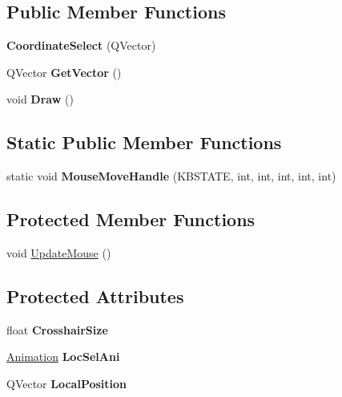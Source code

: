 \subsection*{Public Member Functions}
\begin{DoxyCompactItemize}
\item 
{\bfseries Coordinate\+Select} (Q\+Vector)\hypertarget{classCoordinateSelect_a940c5f6b9f4fd39ac7aaab7e03520146}{}\label{classCoordinateSelect_a940c5f6b9f4fd39ac7aaab7e03520146}

\item 
Q\+Vector {\bfseries Get\+Vector} ()\hypertarget{classCoordinateSelect_a224993e25ecf585555ea5223ea8e8417}{}\label{classCoordinateSelect_a224993e25ecf585555ea5223ea8e8417}

\item 
void {\bfseries Draw} ()\hypertarget{classCoordinateSelect_a95c5bdd9e68c9bc234d6f7be40a80e93}{}\label{classCoordinateSelect_a95c5bdd9e68c9bc234d6f7be40a80e93}

\end{DoxyCompactItemize}
\subsection*{Static Public Member Functions}
\begin{DoxyCompactItemize}
\item 
static void {\bfseries Mouse\+Move\+Handle} (K\+B\+S\+T\+A\+TE, int, int, int, int, int)\hypertarget{classCoordinateSelect_a4309312034b454ca69e76dbbdf8b935c}{}\label{classCoordinateSelect_a4309312034b454ca69e76dbbdf8b935c}

\end{DoxyCompactItemize}
\subsection*{Protected Member Functions}
\begin{DoxyCompactItemize}
\item 
void \hyperlink{classCoordinateSelect_aee21b92610c335294dfd319587edb13c}{Update\+Mouse} ()
\end{DoxyCompactItemize}
\subsection*{Protected Attributes}
\begin{DoxyCompactItemize}
\item 
float {\bfseries Crosshair\+Size}\hypertarget{classCoordinateSelect_a9908f8b93ac19dd8100abc32ba8d0472}{}\label{classCoordinateSelect_a9908f8b93ac19dd8100abc32ba8d0472}

\item 
\hyperlink{classAnimation}{Animation} {\bfseries Loc\+Sel\+Ani}\hypertarget{classCoordinateSelect_a577e8742dbd0413d4a0927b5816a2c3e}{}\label{classCoordinateSelect_a577e8742dbd0413d4a0927b5816a2c3e}

\item 
Q\+Vector {\bfseries Local\+Position}\hypertarget{classCoordinateSelect_a05b9dd3df20f84f8a703515ac9b07171}{}\label{classCoordinateSelect_a05b9dd3df20f84f8a703515ac9b07171}

\end{DoxyCompactItemize}



